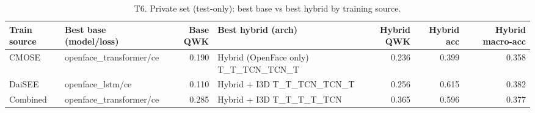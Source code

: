 \begin{table}[ht]
\centering
\caption{T6. Private set (test-only): best base vs best hybrid by training source.}
\label{tab:T6_private_by_source}
\begin{tabular}{llrlrrr}
\toprule
Train source & Best base (model/loss) & Base QWK & Best hybrid (arch) & Hybrid QWK & Hybrid acc & Hybrid macro-acc \\
\midrule
CMOSE & openface\_transformer/ce & 0.190 & Hybrid (OpenFace only) T\_T\_TCN\_TCN\_T & 0.236 & 0.399 & 0.358 \\
DaiSEE & openface\_lstm/ce & 0.110 & Hybrid + I3D T\_T\_TCN\_TCN\_T & 0.256 & 0.615 & 0.382 \\
Combined & openface\_transformer/ce & 0.285 & Hybrid + I3D T\_T\_T\_T\_TCN & 0.365 & 0.596 & 0.377 \\
\bottomrule
\end{tabular}
\end{table}
